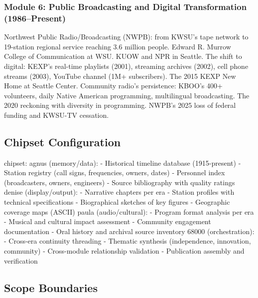 \documentclass[11pt,letterpaper]{article}
\begin{document}
\subsubsection{Module 6: Public Broadcasting and Digital Transformation (1986--Present)}
Northwest Public Radio/Broadcasting (NWPB): from KWSU's tape network to 19-station regional service reaching 3.6 million people. Edward R. Murrow College of Communication at WSU. KUOW and NPR in Seattle. The shift to digital: KEXP's real-time playlists (2001), streaming archives (2002), cell phone streams (2003), YouTube channel (1M+ subscribers). The 2015 KEXP New Home at Seattle Center. Community radio's persistence: KBOO's 400+ volunteers, daily Native American programming, multilingual broadcasting. The 2020 reckoning with diversity in programming. NWPB's 2025 loss of federal funding and KWSU-TV cessation.

\subsection{Chipset Configuration}

\begin{asciibox}
chipset:
  agnus (memory/data):
    - Historical timeline database (1915-present)
    - Station registry (call signs, frequencies, owners, dates)
    - Personnel index (broadcasters, owners, engineers)
    - Source bibliography with quality ratings
  denise (display/output):
    - Narrative chapters per era
    - Station profiles with technical specifications
    - Biographical sketches of key figures
    - Geographic coverage maps (ASCII)
  paula (audio/cultural):
    - Program format analysis per era
    - Musical and cultural impact assessment
    - Community engagement documentation
    - Oral history and archival source inventory
  68000 (orchestration):
    - Cross-era continuity threading
    - Thematic synthesis (independence, innovation, community)
    - Cross-module relationship validation
    - Publication assembly and verification
\end{asciibox}

\subsection{Scope Boundaries}
\end{document}
